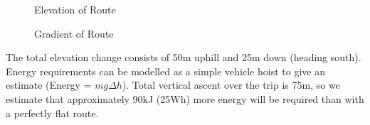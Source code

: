 \documentclass[journal,10pt]{IEEEtran}
\begin{document}
            \begin{figure}[H]
                \centering
                \caption{Elevation of Route}
                \label{fig:elevation}
            \end{figure}
            \begin{figure}[H]
                \centering
                \caption{Gradient of Route}
                \label{fig:gradient}
            \end{figure}
            The total elevation change consists of 50m uphill and 25m down (heading south). Energy requirements can be modelled as a simple vehicle hoist to give an estimate (Energy = $mg\Delta h$). Total vertical ascent over the trip is 75m, so we estimate that approximately 90kJ (25Wh) more energy will be required than with a perfectly flat route.
\end{document}
